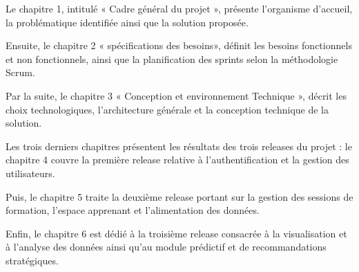 Le chapitre 1, intitulé « Cadre général du projet », présente l'organisme d'accueil, la problématique identifiée ainsi que la solution proposée. 

Ensuite, le chapitre 2 « spécifications des besoins», définit les besoins fonctionnels et non fonctionnels, ainsi que la planification des sprints selon la méthodologie Scrum. 

Par la suite, le chapitre 3 « Conception et environnement Technique », décrit les choix technologiques, l'architecture générale et la conception technique de la solution. 

Les trois derniers chapitres présentent les résultats des trois releases du projet : le chapitre 4 couvre la première release relative à l'authentification et la gestion des utilisateurs. 

Puis, le chapitre 5 traite la deuxième release portant sur la gestion des sessions de formation, l'espace apprenant et l'alimentation des données. 

Enfin, le chapitre 6 est dédié à la troisième release consacrée à la visualisation et à l'analyse des données ainsi qu'au module prédictif et de recommandations stratégiques.